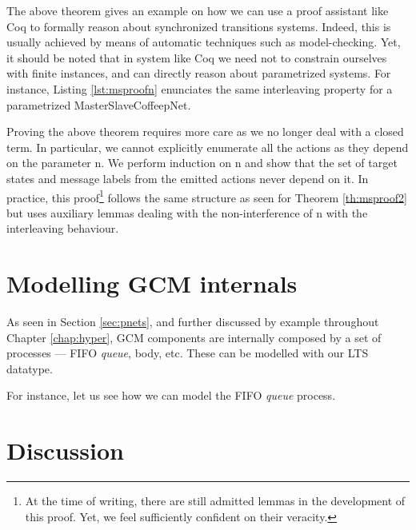 	The above theorem gives an example on how we can use a proof assistant like Coq to formally reason about
	synchronized transitions systems. Indeed, this is usually achieved by means of automatic techniques such
	as model-checking. Yet, it should be noted that in system like Coq we need not to constrain ourselves
	with finite instances, and can directly reason about parametrized systems. 
	For instance, Listing \ref{lst:msproofn} enunciates the same interleaving property for a parametrized
	\textsf{MasterSlaveCoffeepNet}.

					

	Proving the above theorem requires more care as we no longer deal with a closed term.
	In particular, we cannot explicitly enumerate all the \textsf{actions} as they depend on 
	the parameter \textsf{n}.	We perform induction on \textsf{n} and show that
	the set of target states and message labels from the emitted \textsf{actions} never depend on it. 
	In practice, this proof\footnote{At the time of writing, there are still admitted lemmas in the development of this proof. 
	Yet, we feel sufficiently confident on their veracity.}
	follows the same structure as seen for Theorem \ref{th:msproof2} but 	uses auxiliary lemmas 
	dealing with the non-interference of \textsf{n} with the interleaving behaviour.
	
	
	
		
		
\section{Modelling GCM internals}
\label{sec:gcmpnets}


	 As seen in Section \ref{sec:pnets}, and further discussed by example throughout Chapter \ref{chap:hyper},
   \ac{GCM} components are internally composed by a set of processes --- \ac{FIFO} \textit{queue}, \textsf{body}, 
   etc. These can be modelled with our \textsf{LTS} datatype.
   
   	For instance, let us see how we can model the \ac{FIFO} \textit{queue} process.  
 	



\section{Discussion}
\label{sec:behaviourdiscussion}
	
